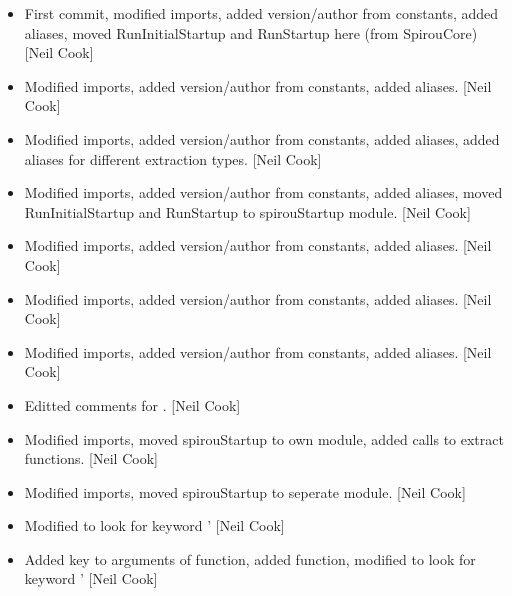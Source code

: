 \documentclass[a4paper,10pt,english]{report}
\begin{document}
\begin{itemize}
\item {} 
First commit, modified imports, added version/author from constants,
added  aliases, moved RunInitialStartup and RunStartup here
(from SpirouCore) {[}Neil Cook{]}

\item {} 
Modified imports, added version/author from constants, added 
aliases. {[}Neil Cook{]}

\item {} 
Modified imports, added version/author from constants, added 
aliases, added aliases for different extraction types. {[}Neil Cook{]}

\item {} 
Modified imports, added version/author from constants, added 
aliases, moved RunInitialStartup and RunStartup to spirouStartup
module. {[}Neil Cook{]}

\item {} 
Modified imports, added version/author from constants, added 
aliases. {[}Neil Cook{]}

\item {} 
Modified imports, added version/author from constants, added 
aliases. {[}Neil Cook{]}

\item {} 
Modified imports, added version/author from constants, added 
aliases. {[}Neil Cook{]}

\item {} 
Editted comments for . {[}Neil Cook{]}

\item {} 
Modified imports, moved spirouStartup to own module, added calls to
extract functions. {[}Neil Cook{]}

\item {} 
Modified imports, moved spirouStartup to seperate module. {[}Neil Cook{]}

\item {} 
Modified  to look for keyword ’ {[}Neil
Cook{]}

\item {} 
Added key to arguments of  function, added
 function, modified  to
look for keyword ’ {[}Neil Cook{]}


\end{itemize}
\end{document}
